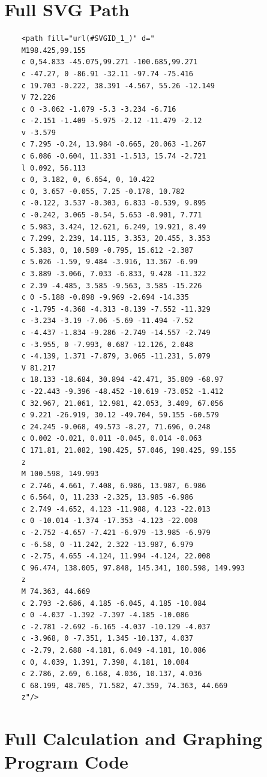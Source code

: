\documentclass[letterpaper, 12pt]{article}
\begin{document}



\appendix

\section{Full SVG Path} \label{app:fullSVG}

\begin{verbatim}
    <path fill="url(#SVGID_1_)" d="
    M198.425,99.155
    c 0,54.833 -45.075,99.271 -100.685,99.271
    c -47.27, 0 -86.91 -32.11 -97.74 -75.416
    c 19.703 -0.222, 38.391 -4.567, 55.26 -12.149
    V 72.226
    c 0 -3.062 -1.079 -5.3 -3.234 -6.716
    c -2.151 -1.409 -5.975 -2.12 -11.479 -2.12
    v -3.579
    c 7.295 -0.24, 13.984 -0.665, 20.063 -1.267
    c 6.086 -0.604, 11.331 -1.513, 15.74 -2.721
    l 0.092, 56.113
    c 0, 3.182, 0, 6.654, 0, 10.422
    c 0, 3.657 -0.055, 7.25 -0.178, 10.782
    c -0.122, 3.537 -0.303, 6.833 -0.539, 9.895
    c -0.242, 3.065 -0.54, 5.653 -0.901, 7.771
    c 5.983, 3.424, 12.621, 6.249, 19.921, 8.49
    c 7.299, 2.239, 14.115, 3.353, 20.455, 3.353
    c 5.383, 0, 10.589 -0.795, 15.612 -2.387
    c 5.026 -1.59, 9.484 -3.916, 13.367 -6.99
    c 3.889 -3.066, 7.033 -6.833, 9.428 -11.322
    c 2.39 -4.485, 3.585 -9.563, 3.585 -15.226
    c 0 -5.188 -0.898 -9.969 -2.694 -14.335
    c -1.795 -4.368 -4.313 -8.139 -7.552 -11.329
    c -3.234 -3.19 -7.06 -5.69 -11.494 -7.52
    c -4.437 -1.834 -9.286 -2.749 -14.557 -2.749
    c -3.955, 0 -7.993, 0.687 -12.126, 2.048
    c -4.139, 1.371 -7.879, 3.065 -11.231, 5.079
    V 81.217
    c 18.133 -18.684, 30.894 -42.471, 35.809 -68.97
    c -22.443 -9.396 -48.452 -10.619 -73.052 -1.412
    C 32.967, 21.061, 12.981, 42.053, 3.409, 67.056
    c 9.221 -26.919, 30.12 -49.704, 59.155 -60.579
    c 24.245 -9.068, 49.573 -8.27, 71.696, 0.248
    c 0.002 -0.021, 0.011 -0.045, 0.014 -0.063
    C 171.81, 21.082, 198.425, 57.046, 198.425, 99.155
    z 
    M 100.598, 149.993
    c 2.746, 4.661, 7.408, 6.986, 13.987, 6.986
    c 6.564, 0, 11.233 -2.325, 13.985 -6.986
    c 2.749 -4.652, 4.123 -11.988, 4.123 -22.013
    c 0 -10.014 -1.374 -17.353 -4.123 -22.008
    c -2.752 -4.657 -7.421 -6.979 -13.985 -6.979
    c -6.58, 0 -11.242, 2.322 -13.987, 6.979
    c -2.75, 4.655 -4.124, 11.994 -4.124, 22.008
    C 96.474, 138.005, 97.848, 145.341, 100.598, 149.993
    z 
    M 74.363, 44.669
    c 2.793 -2.686, 4.185 -6.045, 4.185 -10.084
    c 0 -4.037 -1.392 -7.397 -4.185 -10.086
    c -2.781 -2.692 -6.165 -4.037 -10.129 -4.037
    c -3.968, 0 -7.351, 1.345 -10.137, 4.037
    c -2.79, 2.688 -4.181, 6.049 -4.181, 10.086
    c 0, 4.039, 1.391, 7.398, 4.181, 10.084
    c 2.786, 2.69, 6.168, 4.036, 10.137, 4.036
    C 68.199, 48.705, 71.582, 47.359, 74.363, 44.669
    z"/>
\end{verbatim}

\section{Full Calculation and Graphing Program Code}




\end{document}
